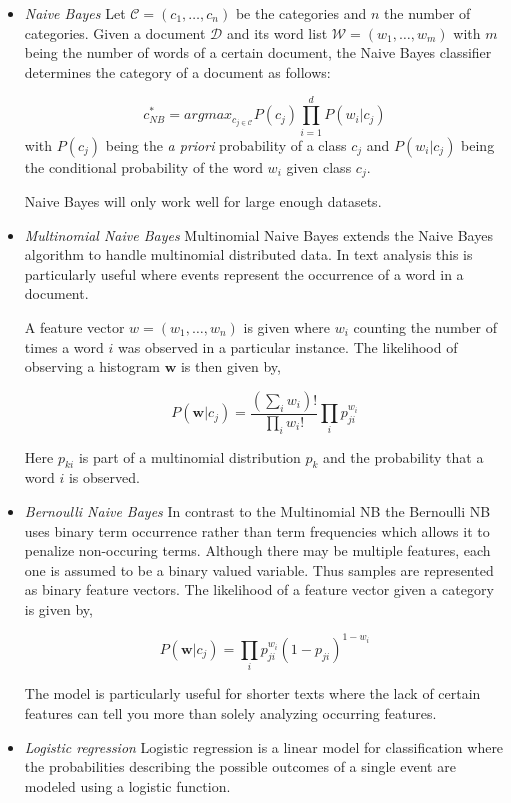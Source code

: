 \documentclass[a4paper,12pt]{article}
\begin{document}
\begin{itemize}
\item \textit{Naive Bayes} Let $\mathcal{C} = (c_1,\dots,c_n)$ be the categories and $n$ the number of categories. Given a document $\mathcal{D}$ and its word list $\mathcal{W} = (w_1, \dots, w_m)$ with $m$ being the number of words of a certain document, the Naive Bayes classifier determines the category of a document as follows:

$$
c^*_{NB} = argmax_{c_{j \in \mathcal{C}}} P(c_j) \prod^d_{i = 1} P(w_i | c_j)
$$
with $P(c_j)$ being the \textit{a priori} probability of a class $c_j$ and $P(w_i | c_j)$ being the conditional probability of the word $w_i$ given class $c_j$.

Naive Bayes will only work well for large enough datasets. 

\item \textit{Multinomial Naive Bayes}
Multinomial Naive Bayes extends the Naive Bayes algorithm to handle multinomial distributed data. In text analysis this is particularly useful where events represent the occurrence of a word in a document. 

A feature vector $w = (w_1, \dots, w_n)$ is given where $w_i$ counting the number of times a word $i$ was observed in a particular instance. The likelihood of observing a histogram $\mathbf{w}$ is then given by,

$$
 P(\mathbf{w}| c_j) = \frac{(\sum_{i}{w_i})!}{\prod_{i} w_i!}\prod_{i}p^{w_i}_{ji}
$$

Here $p_{ki}$ is part of a multinomial distribution $p_{k}$ and the probability that a word $i$ is observed.

\item \textit{Bernoulli Naive Bayes}
In contrast to the Multinomial NB the Bernoulli NB uses binary term occurrence rather than term frequencies which allows it to penalize non-occuring terms. Although there may be multiple features, each one is assumed to be a binary valued variable. Thus samples are represented as binary feature vectors. The likelihood of a feature vector given a category is given by,

$$
 P(\mathbf{w}| c_j) =\prod_{i} p^{w_i}_{ji}(1-p_{ji})^{1-w_i}
$$


The model is particularly useful for shorter texts where the lack of certain features can tell you more than solely analyzing occurring features. 

\item \textit{Logistic regression}
Logistic regression is a linear model for classification where the probabilities describing the possible outcomes of a single event are modeled using a logistic function.


\end{itemize}
\end{document}

